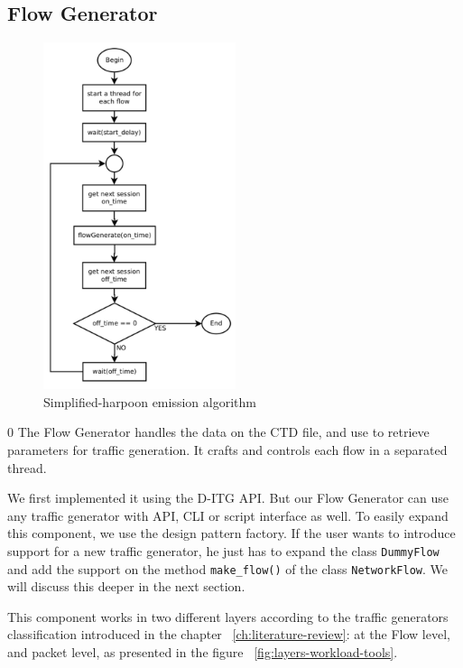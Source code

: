\subsection{Flow Generator}

\begin{figure}[ht!]
    \centering
    \includegraphics[height=4.0in]{figures/ch3/alg-simplified-harpoon}
    \caption{Simplified-harpoon emission algorithm}
    \label{fig:alg-simplified-harpoon}
\end{figure}
0
The Flow Generator handles the data on the CTD file, and use to retrieve parameters for traffic generation. It crafts and controls each flow in a separated thread. 

We first implemented it using the D-ITG API. But our Flow Generator can use any traffic generator with API, CLI or script interface as well. To easily expand this component, we use the design pattern factory. If the user wants to introduce support for a new traffic generator, he just has to expand the class \texttt{DummyFlow} and add the support on the method \texttt{make\_flow()} of the class \texttt{NetworkFlow}. We will discuss this deeper in the next section.

This component works in two different layers according to the traffic generators classification introduced in the chapter ~\ref{ch:literature-review}: at the Flow level, and packet level, as presented in the figure ~\ref{fig:layers-workload-tools}. 

